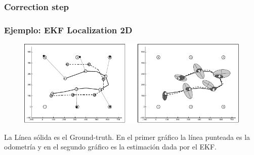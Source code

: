 \begin{frame}
	\frametitle{Correction step}
    
   	\begin{figure}[!h]
        \centering
    \end{figure}

\end{frame}

\begin{frame}
	\frametitle{Ejemplo: EKF Localization 2D}
	
	\begin{figure}[!h]
		\includegraphics[width=\columnwidth]{./images/ekf_localization_example.pdf}
	\end{figure}
    
    La Línea sólida es el Ground-truth. En el primer gráfico la línea punteada es la odometría y en el segundo gráfico es la estimación dada por el EKF.
	
\end{frame}

